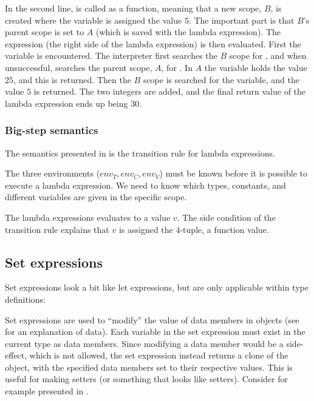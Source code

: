 In the second line,  is called as a function, meaning
that a new scope, $B$, is created where the variable  is
assigned the value $5$. The important part is that $B$'s parent scope is set to
$A$ (which is saved with the lambda expression). The expression (the right side
of the lambda expression) is then evaluated. First the  variable is
encountered. The interpreter first searches the $B$ scope for , and
when unsuccessful, searches the parent scope, $A$, for . In $A$ the
variable  holds the value $25$, and this is returned. Then the
$B$ scope is searched for the  variable, and the value $5$ is
returned. The two integers are added, and the final return value of the
lambda expression ends up being $30$.

\subsubsection{Big-step semantics}

The semantics presented in  is the transition rule for
lambda expressions.



The three environments ($env_{T}, env_{C}, env_{V}$) must be known before it is
possible to execute a lambda expression. We need to know which types, constants,
and different variables are given in the specific scope.

The lambda expressions evaluates to a value $v$. The side condition
of the transition rule explains that $v$ is assigned the $4$-tuple, a
function value.

\subsection{Set expressions}
\label{sec:setexpressions}

Set expressions look a bit like let expressions, but are only applicable within
type definitions:

\begin{ebnf}
\end{ebnf}

Set expressions are used to ``modify'' the value of data members in objects (see
 for an explanation of data). Each variable in the
set expression must exist in the current type as data members. Since modifying a
data member would be a side-effect, which is not allowed, the set expression
instead returns a clone of the object, with the specified data members set to
their respective values. This is useful for making setters (or something that
looks like setters). Consider for example presented in .

